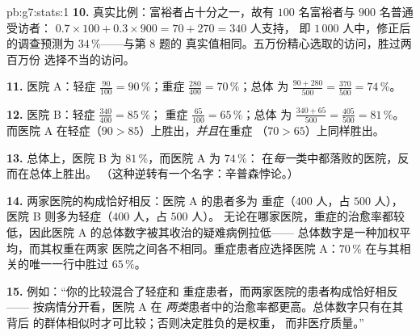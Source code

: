 \begin{solution}{pb:g7:stats:1}
\textbf{10.} 真实比例：富裕者占十分之一，故有 $100$
名富裕者与 $900$ 名普通受访者：
$0.7 \times 100 + 0.3 \times 900 = 70 + 270 = 340$ 人支持，
即 $1\,000$ 人中，修正后的调查预测为 $34\,\%$——与第 8 题的
真实值相同。五万份精心选取的访问，胜过两百万份
选择不当的访问。

\textbf{11.} 医院 A：轻症 $\frac{90}{100} = 90\,\%$；重症
$\frac{280}{400} = 70\,\%$；总体
为 $\frac{90 + 280}{500} = \frac{370}{500} = 74\,\%$。

\textbf{12.} 医院 B：轻症 $\frac{340}{400} = 85\,\%$；
重症 $\frac{65}{100} = 65\,\%$；总体
为 $\frac{340 + 65}{500} = \frac{405}{500} = 81\,\%$。
而医院 A 在轻症（$90 > 85$）上胜出，\emph{并且}在重症
（$70 > 65$）上同样胜出。

\textbf{13.} 总体上，医院 B 为 $81\,\%$，而医院 A 为 $74\,\%$：
在\emph{每一}类中都落败的医院，反而在总体上胜出。
（这种逆转有一个名字：辛普森悖论。）

\textbf{14.} 两家医院的构成恰好相反：医院 A 的患者多为
重症（$400$ 人，占 $500$ 人），医院 B 则多为轻症（$400$ 人，占 $500$ 人）。
无论在哪家医院，重症的治愈率都较低，因此医院 A
的总体数字被其收治的疑难病例拉低——
总体数字是一种加权平均，而其权重在两家
医院之间各不相同。重症患者应选择医院 A：$70\,\%$
在与其相关的唯一一行中胜过 $65\,\%$。

\textbf{15.} 例如：“你的比较混合了轻症和
重症患者，而两家医院的患者构成恰好相反——
按病情分开看，医院 A 在
\emph{两类}患者中的治愈率都更高。总体数字只有在其背后
的群体相似时才可比较；否则决定胜负的是权重，
而非医疗质量。”
\end{solution}
